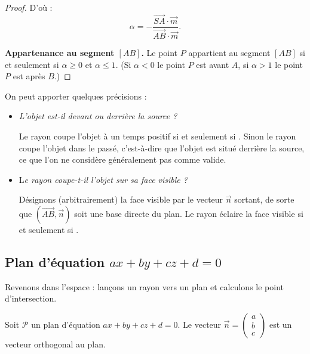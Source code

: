 \documentclass[11pt,class=report,crop=false]{standalone}
\begin{document}
\begin{proof}
D'où :
$$\alpha = -\frac{\overrightarrow{SA}\cdot\vec{m}}{\overrightarrow{AB}\cdot\vec{m}}.$$



\medskip
\textbf{Appartenance au segment $[AB]$.}
Le point $P$ appartient au segment $[AB]$ si et seulement si $\alpha \ge 0$ et $\alpha \le 1$.
(Si $\alpha < 0$ le point $P$ est \og{}avant\fg{} $A$, si $\alpha > 1$ le point $P$ est \og{}après\fg{} $B$.)

\end{proof}

On peut apporter quelques précisions :
\begin{itemize}
  \item \emph{L'objet est-il devant ou derrière la source ?}
 
  Le rayon coupe l'objet à un temps positif si et seulement si . Sinon le rayon coupe l'objet \og{}dans le passé\fg{}, c'est-à-dire que l'objet est situé derrière la source, ce que l'on ne considère généralement pas comme valide.

  \item L\emph{e rayon coupe-t-il l'objet sur sa face visible ?}

  Désignons (arbitrairement) la face visible par le vecteur $\vec n$ sortant, de sorte que $(\overrightarrow{AB},\vec{n})$ soit une base directe du plan. Le rayon éclaire la face visible si et seulement si .
  
  
  
\end{itemize}

\subsection{Plan d'équation $ax+by+cz+d=0$}

Revenons dans l'espace : lançons un rayon vers un plan et calculons le point d'intersection.


Soit $\mathcal{P}$ un plan d'équation $ax+by+cz+d=0$.
Le vecteur $\vec{n} = \left(\begin{smallmatrix}a\\b\\c\end{smallmatrix}\right)$ est un vecteur orthogonal au plan. 
\end{document}
